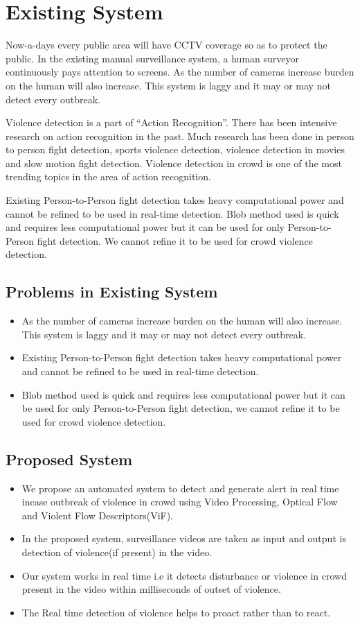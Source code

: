 \section{Existing System}
Now-a-days every public area will have CCTV coverage so as to protect the public. In the existing manual surveillance system, a human surveyor continuously pays attention to screens. As the number of cameras increase burden on the human will also increase. This system is laggy and it may or may not detect every outbreak. 
\par
Violence detection is a part of “Action Recognition”. There has been intensive research on action recognition in the past. Much research has been done in person to person fight detection, sports violence detection, violence detection in movies and slow motion fight detection. Violence detection in crowd is one of the most trending topics in the area of action recognition. 
\par
Existing Person-to-Person fight detection takes heavy computational power and cannot be refined to be used in real-time detection. Blob method used is quick and requires less computational power but it can be used for only Person-to-Person fight detection. We cannot refine it to be used for crowd violence detection.
\subsection{Problems in Existing System}
\begin{itemize}
	\item As the number of cameras increase burden on the human will also increase. This system is laggy and it may or may not detect every outbreak.
	\item Existing Person-to-Person fight detection takes heavy computational power and cannot be refined to be used in real-time detection.
	\item Blob method used is quick and requires less computational power but it can be used for only Person-to-Person fight detection, we cannot refine it to be used for crowd violence detection.
\end{itemize}
\subsection{Proposed System}
\begin{itemize}
  \item We propose an automated system to detect and generate alert in real time incase outbreak of violence in crowd using Video Processing, Optical Flow and Violent Flow Descriptors(ViF). 
  \item In the proposed system, surveillance videos are taken as input and output is detection of violence(if present) in the video.
  \item Our system works in real time i.e it detects disturbance or violence in crowd present in the video within milliseconds of outset of violence. 
  \item The Real time detection of violence helps to proact rather than to react.
\end{itemize}
